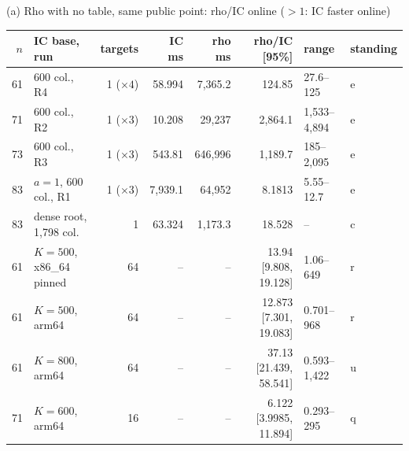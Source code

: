 (a) Rho with no table, same public point: rho/IC online ($>1$: IC faster online)\\[2pt]
\begin{tabular}{@{}rlrrrrll@{}}
\toprule
$n$ & IC base, run & targets & IC ms & rho ms & rho/IC [95\%] & range & standing \\
\midrule
61 & 600 col., R4 & 1 ($\times4$) & 58.994 & 7{,}365.2 & 124.85 & 27.6--125 & e \\
71 & 600 col., R2 & 1 ($\times3$) & 10.208 & 29{,}237 & 2{,}864.1 & 1{,}533--4{,}894 & e \\
73 & 600 col., R3 & 1 ($\times3$) & 543.81 & 646{,}996 & 1{,}189.7 & 185--2{,}095 & e \\
83 & $a=1$, 600 col., R1 & 1 ($\times3$) & 7{,}939.1 & 64{,}952 & 8.1813 & 5.55--12.7 & e \\
83 & dense root, 1{,}798 col. & 1 & 63.324 & 1{,}173.3 & 18.528 & -- & c \\
61 & $K=500$, x86\_64 pinned & 64 & -- & -- & 13.94 [9.808, 19.128] & 1.06--649 & r \\
61 & $K=500$, arm64 & 64 & -- & -- & 12.873 [7.301, 19.083] & 0.701--968 & r \\
61 & $K=800$, arm64 & 64 & -- & -- & 37.13 [21.439, 58.541] & 0.593--1{,}422 & u \\
71 & $K=600$, arm64 & 16 & -- & -- & 6.122 [3.9985, 11.894] & 0.293--295 & q \\
\bottomrule
\end{tabular}

\medskip


